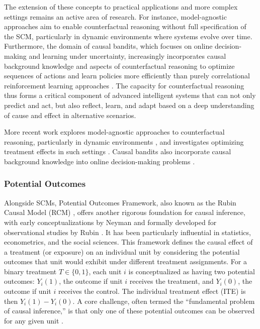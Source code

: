 {The extension of these concepts to practical applications and more complex settings remains an active area of research. For instance, model-agnostic approaches aim to enable counterfactual reasoning without full specification of the SCM, particularly in dynamic environments where systems evolve over time. Furthermore, the domain of causal bandits, which focuses on online decision-making and learning under uncertainty, increasingly incorporates causal background knowledge and aspects of counterfactual reasoning to optimize sequences of actions and learn policies more efficiently than purely correlational reinforcement learning approaches \cite{Lattimore2016Causal, Lee2018Structural, Zhang2022Causal, Bilodeau2022Adaptively}. The capacity for counterfactual reasoning thus forms a critical component of advanced intelligent systems that can not only predict and act, but also reflect, learn, and adapt based on a deep understanding of cause and effect in alternative scenarios.

More recent work explores model-agnostic approaches to counterfactual reasoning, particularly in dynamic environments \cite{Berrevoets2021ModelAgnostic}, and investigates optimizing treatment effects in such settings \cite{Berrevoets2022Treatment}. Causal bandits also incorporate causal background knowledge into online decision-making problems \cite{Lattimore2016Causal, Lee2018Structural, Zhang2022Causal, Bilodeau2022Adaptively}.


\subsubsection{Potential Outcomes}
\label{subsec:potential_outcomes}

Alongside SCMs, Potential Outcomes Framework, also known as the Rubin Causal Model (RCM) \cite{holland1986statistics}, offers another rigorous foundation for causal inference, with early conceptualizations by Neyman \cite{splawa1990application} and formally developed for observational studies by Rubin \cite{rubin1974estimating}. It has been particularly influential in statistics, econometrics, and the social sciences. This framework defines the causal effect of a treatment (or exposure) on an individual unit by considering the potential outcomes that unit would exhibit under different treatment assignments. For a binary treatment $T \in \{0,1\}$, each unit $i$ is conceptualized as having two potential outcomes: $Y_i(1)$, the outcome if unit $i$ receives the treatment, and $Y_i(0)$, the outcome if unit $i$ receives the control. The individual treatment effect (ITE) is then $Y_i(1) - Y_i(0)$. A core challenge, often termed the ``fundamental problem of causal inference,'' is that only one of these potential outcomes can be observed for any given unit \cite{holland1986statistics}.

}
